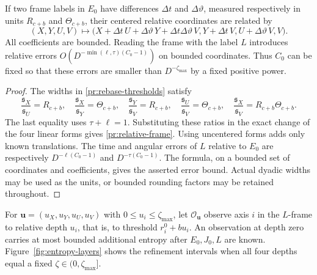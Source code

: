 \begin{lemma}
\label{lem:pr-relative-frame}
If two frame labels in $E_0$ have differences $\Delta t$ and
$\Delta\vartheta$, measured respectively in units $R_{c+b}$ and
$\Theta_{c+b}$, their centered relative coordinates are related by
\begin{equation}
 (X,Y,U,V)\longmapsto
 \bigl(X+\Delta t\,U+\Delta\vartheta\,Y
                 +\Delta t\Delta\vartheta\,V,
       Y+\Delta t\,V,
       U+\Delta\vartheta\,V,V\bigr).
\label{pr:relative-frame}
\end{equation}
All coefficients are bounded. Reading the frame with the label
$L$ introduces relative errors
$O(D^{-\min(\ell,\tau)(C_0-1)})$ on bounded coordinates.
Thus $C_0$ can be fixed so that these errors are smaller than
$D^{-\zeta_{\max}}$ by a fixed positive power.
\end{lemma}

\begin{proof}
The widths in \eqref{pr:rebase-thresholds} satisfy
\begin{equation}
 \frac{\mathfrak s_X}{\mathfrak s_U}=R_{c+b},\quad
 \frac{\mathfrak s_X}{\mathfrak s_Y}=\Theta_{c+b},\quad
 \frac{\mathfrak s_Y}{\mathfrak s_V}=R_{c+b},\quad
 \frac{\mathfrak s_U}{\mathfrak s_V}=\Theta_{c+b},\quad
 \frac{\mathfrak s_X}{\mathfrak s_V}=R_{c+b}\Theta_{c+b}.
\label{pr:width-ratios}
\end{equation}
The last equality uses $\tau+\ell=1$.
Substituting these ratios in the exact change of the four linear
forms gives \eqref{pr:relative-frame}.
Using uncentered forms adds only known translations.
The time and angular errors of $L$ relative to $E_0$ are respectively
$D^{-\ell(C_0-1)}$ and $D^{-\tau(C_0-1)}$.
The formula, on a bounded set of coordinates and coefficients,
gives the asserted error bound.
Actual dyadic widths may be used as the units, or bounded rounding
factors may be retained throughout.
\end{proof}

For $\mathbf u=(u_X,u_Y,u_U,u_V)$ with
$0\le u_i\le\zeta_{\max}$, let $\mathcal O_{\mathbf u}$ observe
axis $i$ in the $L$-frame to relative depth $u_i$, that is, to
threshold $r_i^0+bu_i$.
An observation at depth zero carries at most bounded additional
entropy after $E_0,J_0,L$ are known. Figure~\ref{fig:entropy-layers}
shows the refinement intervals when all four depths equal a fixed
$\zeta\in(0,\zeta_{\max}]$.



